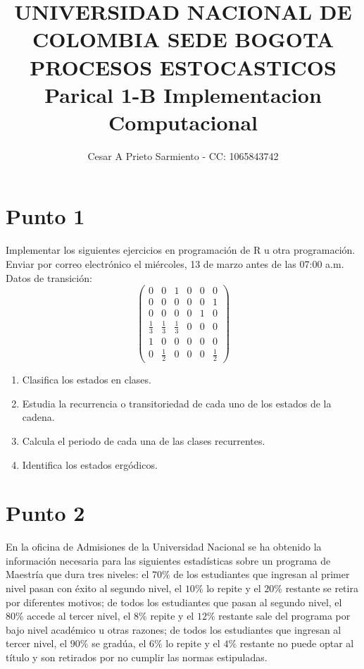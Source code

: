 \documentclass{article}
\title{UNIVERSIDAD NACIONAL DE COLOMBIA SEDE BOGOTA\\ PROCESOS ESTOCASTICOS \\Parical 1-B Implementacion Computacional}
\author{Cesar A Prieto Sarmiento - CC: 1065843742}
\begin{document}


\maketitle

\section*{Punto 1}

Implementar los siguientes ejercicios en programación de $\mathrm{R}$ u otra programación.
Enviar por correo electrónico el miércoles, 13 de marzo antes de las 07:00 a.m. Datos de transición:
\[
\begin{pmatrix}
0 & 0 & 1 & 0 & 0 & 0 \\
0 & 0 & 0 & 0 & 0 & 1 \\
0 & 0 & 0 & 0 & 1 & 0 \\
\frac{1}{3} & \frac{1}{3} & \frac{1}{3} & 0 & 0 & 0 \\
1 & 0 & 0 & 0 & 0 & 0 \\
0 & \frac{1}{2} & 0 & 0 & 0 & \frac{1}{2}
\end{pmatrix}
\]

\begin{enumerate}
    \item Clasifica los estados en clases.
    \item Estudia la recurrencia o transitoriedad de cada uno de los estados de la cadena.
    \item Calcula el periodo de cada una de las clases recurrentes.
    \item Identifica los estados ergódicos.
\end{enumerate}

\section*{Punto 2}

En la oficina de Admisiones de la Universidad Nacional se ha obtenido la información necesaria para las siguientes estadísticas sobre un programa de Maestría que dura tres niveles: el $70 \%$ de los estudiantes que ingresan al primer nivel pasan con éxito al segundo nivel, el $10 \%$ lo repite y el $20 \%$ restante se retira por diferentes motivos; de todos los estudiantes que pasan al segundo nivel, el $80 \%$ accede al tercer nivel, el $8 \%$ repite y el $12 \%$ restante sale del programa por bajo nivel académico u otras razones; de todos los estudiantes que ingresan al tercer nivel, el $90 \%$ se gradúa, el $6 \%$ lo repite y el $4 \%$ restante no puede optar al título y son retirados por no cumplir las normas estipuladas.
\end{document}

